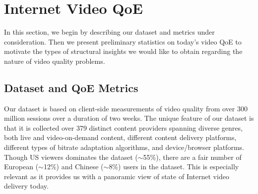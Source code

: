
\section{Internet Video QoE}
\label{sec:measurement:video} 

\newcommand{\numsessions}{numsessions\xspace}
\newcommand{\problemsession}{problem session\xspace}
\newcommand{\problemsessions}{problem sessions\xspace}
\newcommand{\cluster}{cluster\xspace}
\newcommand{\clusters}{clusters\xspace}
\newcommand{\problemcluster}{problem cluster\xspace}
\newcommand{\problemclusters}{problem clusters\xspace}
\newcommand{\problemratio}{problem ratio\xspace}

\newcommand{\criticalcluster}{critical cluster\xspace}
\newcommand{\criticalclusters}{critical clusters\xspace}

In this section, we begin by describing our dataset and
metrics under consideration.
Then we present preliminary statistics on today's 
video QoE to motivate 
the types of structural insights we would
like to obtain regarding the nature of video 
quality problems. 

\subsection{Dataset and QoE Metrics}
\label{subsec:measurement:video:dataset}

Our dataset is based on client-side measurements of
video  quality from over 300 million sessions over a duration
of two weeks. The unique feature of our dataset is that it is 
collected over 379 distinct content providers spanning diverse 
genres, both live and video-on-demand content, different 
content delivery platforms, different types of  bitrate adaptation 
algorithms, and device/browser platforms. 
Though US viewers dominates the dataset ($\sim$55\%), 
there are a fair number of European ($\sim$12\%) and 
Chinese ($\sim$8\%) users in the dataset.
This is especially relevant as it provides us with a panoramic 
view   of state of  Internet video delivery today.


